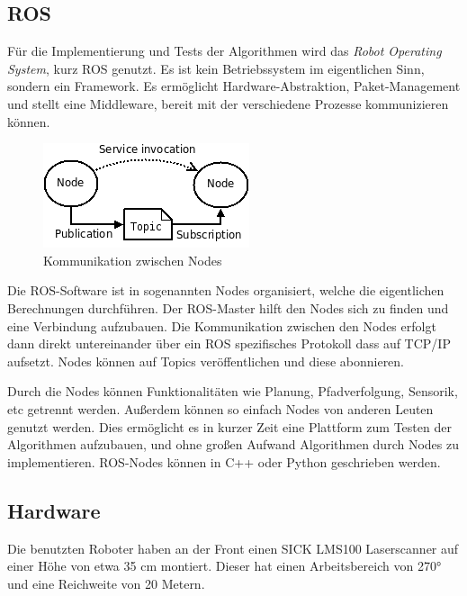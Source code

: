 \documentclass[11pt,a4paper]{article}
\begin{document}
{\subsection{ROS}


F\"ur die Implementierung und Tests der Algorithmen wird das \textit{Robot Operating System}, kurz ROS genutzt. Es ist kein Betriebssystem im eigentlichen Sinn, sondern ein Framework. Es erm\"oglicht Hardware-Abstraktion, Paket-Management und stellt eine Middleware, bereit mit der verschiedene Prozesse kommunizieren k\"onnen. \cite{rosWiki}

\begin{figure}[h]
	\includegraphics[width=\linewidth]{pictures/ROS_basic_concepts.png}
	\caption{Kommunikation zwischen Nodes}
\end{figure}

Die ROS-Software ist in sogenannten Nodes organisiert, welche die eigentlichen Berechnungen durchf\"uhren. Der ROS-Master hilft den Nodes sich zu finden und eine Verbindung aufzubauen. Die Kommunikation zwischen den Nodes erfolgt dann direkt untereinander über ein ROS spezifisches Protokoll dass auf TCP/IP aufsetzt. Nodes k\"onnen auf Topics ver\"offentlichen und diese abonnieren. \cite{rosConcepts}

Durch die Nodes k\"onnen Funktionalit\"aten wie Planung, Pfadverfolgung, Sensorik, etc getrennt werden. Au{\ss}erdem k\"onnen so einfach Nodes von anderen Leuten genutzt werden. Dies erm\"oglicht es in kurzer Zeit eine Plattform zum Testen der Algorithmen aufzubauen, und ohne gro{\ss}en Aufwand Algorithmen durch Nodes zu implementieren. ROS-Nodes k\"onnen in C++ oder Python geschrieben werden.
\subsection{Hardware}

Die benutzten Roboter haben an der Front einen SICK LMS100 Laserscanner auf einer H\"ohe von etwa 35 cm montiert. Dieser hat einen Arbeitsbereich von 270° und eine Reichweite von 20 Metern. 
 
}
\end{document}
